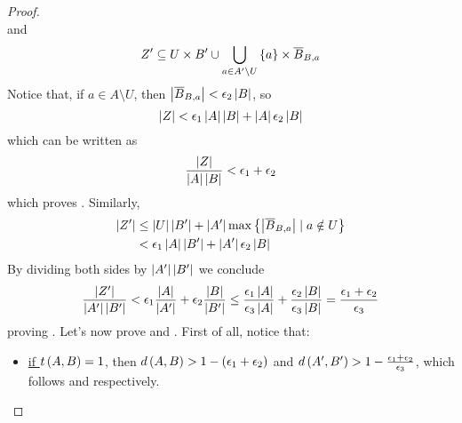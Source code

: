 \begin{lemma}[Lemma 5.17]
\begin{proof}
\[            \]
            and
            \[
                Z' \subseteq U \times B' \cup \bigcup_{a \in A' \setminus U} \left\{ a \right\} \times \overline{B}_{B,a}
            \]
            Notice that, if $a \in A \setminus U$, then $\left| \overline{B}_{B,a} \right| < \epsilon_2 \left| B \right|$, so
            \[
                \left| Z \right| < \epsilon_1 \left| A \right| \left| B \right| + \left| A \right| \epsilon_2 \left| B \right|
            \]
            which can be written as
            \[
                    \frac{\left| Z \right|}{\left| A \right| \left| B \right|} < \epsilon_1 + \epsilon_2
            \]
            which proves .
            Similarly,
            \begin{align*}
                \left| Z' \right| & \leq \left| U \right| \left| B' \right| + \left| A' \right| \max \left\{ \left| \overline{B}_{B,a} \right| \mid a \notin U \right\} \\
                                 & < \epsilon_1 \left| A \right| \left| B' \right| + \left| A' \right| \epsilon_2 \left| B \right|
            \end{align*}
            By dividing both sides by $\left| A' \right| \left| B' \right|$ we conclude
            \[
                \frac{\left| Z' \right|}{\left| A' \right| \left| B' \right|} < \epsilon_1 \frac{\left| A \right|}{\left| A' \right|} + \epsilon_2 \frac{\left| B \right|}{\left| B' \right|}
                \leq \frac{\epsilon_1 \left| A \right|}{\epsilon_3 \left| A \right|} + \frac{\epsilon_2 \left| B \right|} {\epsilon_3 \left| B \right|}
                = \frac{\epsilon_1 + \epsilon_2}{\epsilon_3}
            \]
            proving .
            Let's now prove  and .
            First of all, notice that:
            \begin{itemize}
                \item \underline{if $t\left( A,B \right) = 1$}, then $d\left( A,B \right) > 1 - \left( \epsilon_1 + \epsilon_2 \right)$
                    and $d \left( A',B' \right) > 1 - \frac{\epsilon_1 + \epsilon_2}{\epsilon_3}$, which follows
                     and
                     respectively.

\end{itemize}
\end{proof}
\end{lemma}
